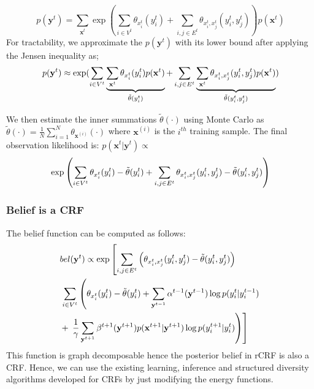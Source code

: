 \documentclass[conference]{IEEEtran}
\newcommand{\todo}[1]{\textcolor{blue}{\textbf{#1}}}
\begin{document}
\begin{equation}
p(\mathbf{y}^t)=\sum_{\mathbf{x}^t} \exp\left( \sum_{i \in V^t} \theta_{x^t_i}(y^t_i) + \sum_{i,j \in E^t} \theta_{x^t_i,x^t_j}(y^t_i,y^t_j) \right) p(\mathbf{x}^t)
\end{equation}
For tractability, we approximate the $p(\mathbf{y}^t)$ with its lower bound after applying the Jensen inequality as;
\begin{equation}
  \small
p(\mathbf{y}^t) \approx \exp ( \sum_{i \in V^t} \underbrace{\sum_{\mathbf{x}^t} \theta_{x^t_i}(y^t_i)  p(\mathbf{x}^t)}_{\tilde{\theta}(y^t_i)} + \sum_{i,j \in E^t} \underbrace{ \sum_{\mathbf{x}^t}  \theta_{x^t_i,x^t_j}(y^t_i,y^t_j) p(\mathbf{x}^t)}_{\tilde{\theta}(y^t_i,y^t_j)} )
\end{equation}

We then estimate the inner summations $\tilde{\theta}(\cdot)$
using Monte Carlo
 as \mbox{$\tilde{\theta}(\cdot) = \frac{1}{N}\sum_{i=1}^N \theta_{\mathbf{x}^{(i)}}(\cdot)$} where $\mathbf{x}^{(i)}$ is the $i^{th}$ training sample. The final observation likelihood is:  $p(\mathbf{x}^t|\mathbf{y}^t) \propto$
\begin{equation}\small
\exp\left( \sum_{i \in V^t} \theta_{x^t_i}(y^t_i) - \tilde{\theta}(y^t_i) + \sum_{i,j \in E^t} \theta_{x^t_i,x^t_j}(y^t_i,y^t_j) - \tilde{\theta}(y^t_i,y^t_j)  \right)
\label{obsprob}
\end{equation}

\subsubsection{Belief is a CRF}
\label{beliscrf}
The belief function can be computed as follows:
\begin{equation}\small
  \begin{aligned}
&bel(\mathbf{y}^t) \propto \exp\left[  \sum_{i,j \in E^t} \left( \theta_{x^t_i,x^t_j}(y^t_i,y^t_j) - \tilde{\theta}(y^t_i,y^t_j) \right) \right. \\
&\left. \sum_{i \in V^t} \left( \theta_{x^t_i}(y^t_i) - \tilde{\theta}(y^t_i) +  \sum_{\mathbf{y}^{t-1}} \alpha^{t-1}(\mathbf{y}^{t-1}) \log p(y^t_i|y^{t-1}_i) \right. \right. \\
&+\left.\left.\frac{1}{\gamma}\sum_{\mathbf{y}^{t+1}} \beta^{t+1}(\mathbf{y}^{t+1}) p(\mathbf{x}^{t+1}|\mathbf{y}^{t+1}) \log p(y^{t+1}_i|y^{t}_i) \right) \right]
\end{aligned}
\label{crfbelief}
\end{equation}
This function is graph decomposable hence the posterior belief in rCRF is also a CRF. Hence, we can use the existing learning, inference and structured diversity algorithms developed for CRFs by just modifying the energy functions.
\end{document}
